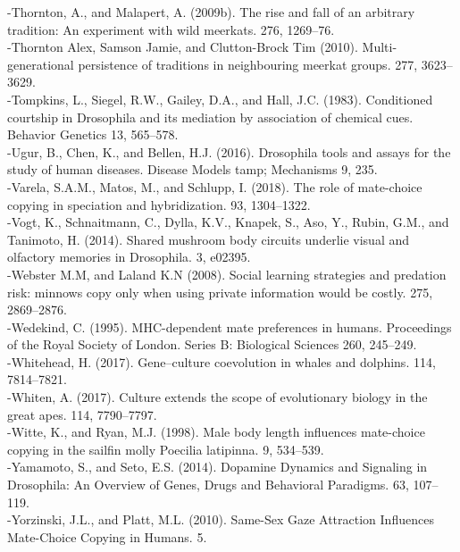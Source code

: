 \documentclass[a4paper, 12pt]{article}
\begin{document}
\begin{singlespace}
{-Thornton, A., and Malapert, A. (2009b). The rise and fall of an arbitrary tradition: An experiment with wild meerkats. 276, 1269–76.\\
-Thornton Alex, Samson Jamie, and Clutton-Brock Tim (2010). Multi-generational persistence of traditions in neighbouring meerkat groups. 277, 3623–3629.\\
-Tompkins, L., Siegel, R.W., Gailey, D.A., and Hall, J.C. (1983). Conditioned courtship in Drosophila and its mediation by association of chemical cues. Behavior Genetics 13, 565–578.\\
-Ugur, B., Chen, K., and Bellen, H.J. (2016). Drosophila tools and assays for the study of human diseases. Disease Models tamp; Mechanisms 9, 235.\\
-Varela, S.A.M., Matos, M., and Schlupp, I. (2018). The role of mate-choice copying in speciation and hybridization. 93, 1304–1322.\\
-Vogt, K., Schnaitmann, C., Dylla, K.V., Knapek, S., Aso, Y., Rubin, G.M., and Tanimoto, H. (2014). Shared mushroom body circuits underlie visual and olfactory memories in Drosophila. 3, e02395.\\
-Webster M.M, and Laland K.N (2008). Social learning strategies and predation risk: minnows copy only when using private information would be costly. 275, 2869–2876.\\
-Wedekind, C. (1995). MHC-dependent mate preferences in humans. Proceedings of the Royal Society of London. Series B: Biological Sciences 260, 245–249.\\
-Whitehead, H. (2017). Gene–culture coevolution in whales and dolphins. 114, 7814–7821.\\
-Whiten, A. (2017). Culture extends the scope of evolutionary biology in the great apes. 114, 7790–7797.\\
-Witte, K., and Ryan, M.J. (1998). Male body length influences mate-choice copying in the sailfin molly Poecilia latipinna. 9, 534–539.\\
-Yamamoto, S., and Seto, E.S. (2014). Dopamine Dynamics and Signaling in Drosophila: An Overview of Genes, Drugs and Behavioral Paradigms. 63, 107–119.\\
-Yorzinski, J.L., and Platt, M.L. (2010). Same-Sex Gaze Attraction Influences Mate-Choice Copying in Humans. 5.\\}

\end{singlespace}
\newrefcontext[sorting=nyt] %

 
\end{document}
